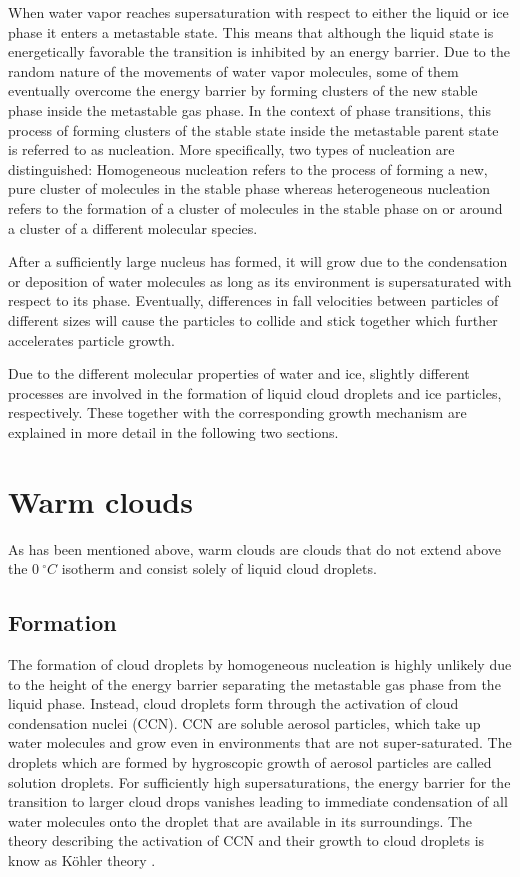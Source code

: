 When water vapor reaches supersaturation with respect to either the liquid or
ice phase it enters a metastable state. This means that although the liquid
state is energetically favorable the transition is inhibited by an energy
barrier. Due to the random nature of the movements of water vapor molecules,
some of them eventually overcome the energy barrier by forming clusters of the
new stable phase inside the metastable gas phase. In the context of phase
transitions, this process of forming clusters of the stable state inside the
metastable parent state is referred to as nucleation. More specifically, two
types of nucleation are distinguished: Homogeneous nucleation refers to the
process of forming a new, pure cluster of molecules in the stable phase whereas
heterogeneous nucleation refers to the formation of a cluster of molecules in
the stable phase on or around a cluster of a different molecular species.

After a sufficiently large nucleus has formed, it will grow due
to the condensation or deposition of water molecules as long as
its environment is supersaturated with respect to its phase.
Eventually, differences in fall velocities between particles
of different sizes will cause the particles to collide and stick
together which further accelerates particle growth.

Due to the different molecular properties of water and ice, slightly different
processes are involved in the formation of liquid cloud droplets and ice
particles, respectively. These together with the corresponding growth mechanism
are explained in more detail in the following two sections.

\section{Warm clouds}

As has been mentioned above, warm clouds are clouds that do not extend above
the $0\ \unit{^\circ C}$ isotherm and consist solely of liquid cloud droplets.

\subsection{Formation}

The formation of cloud droplets by homogeneous nucleation is highly unlikely due
to the height of the energy barrier separating the metastable gas phase from the
liquid phase. Instead, cloud droplets form through the activation of cloud
condensation nuclei (CCN). CCN are soluble aerosol particles, which take up
water molecules and grow even in environments that are not super-saturated. The
droplets which are formed by hygroscopic growth of aerosol particles are called
solution droplets. For sufficiently high supersaturations, the energy barrier
for the transition to larger cloud drops vanishes leading to immediate
condensation of all water molecules onto the droplet that are available in its
surroundings. The theory describing the activation of CCN and their growth
to cloud droplets is know as Köhler theory \cite{kohler36}.


